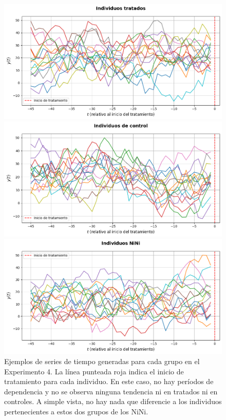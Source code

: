 \documentclass[../../main.tex]{subfiles}
\begin{document}
\begin{figure}[ht]
    \centering
    \begin{minipage}{0.48\textwidth}
        \centering
        \includegraphics[scale=0.27]{figs/Exp4/tratados_sim13.png}
    \end{minipage}
    \hfill
    \begin{minipage}{0.48\textwidth}
        \centering
        \includegraphics[scale=0.27]{figs/Exp4/controles_sim13.png}
    \end{minipage}
    \vspace{0.5em}
    \begin{minipage}{0.6\textwidth}
        \centering
        \includegraphics[scale=0.27]{figs/Exp4/ninis_sim13.png}
    \end{minipage}
    \caption{Ejemplos de series de tiempo generadas para cada grupo en el Experimento 4.
    La línea punteada roja indica el inicio de tratamiento para cada individuo. En este
    caso, no hay períodos de dependencia y no se observa ninguna tendencia ni en tratados
    ni en controles. A simple vista, no hay nada que diferencie a los individuos
    pertenecientes a estos dos grupos de los NiNi.}
    \label{fig:time_series_exp4}
\end{figure}
\end{document}
